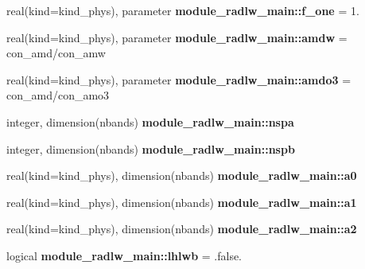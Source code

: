 \begin{DoxyCompactItemize}
\item 
\mbox{\label{group__module__radlw__main_ga518605a1451822f1888c6c7e85e07328}} 
real(kind=kind\+\_\+phys), parameter {\bfseries module\+\_\+radlw\+\_\+main\+::f\+\_\+one} = 1.
\item 
\mbox{\label{group__module__radlw__main_ga9845c3a6eaa014e6a310fe1436162e37}} 
real(kind=kind\+\_\+phys), parameter {\bfseries module\+\_\+radlw\+\_\+main\+::amdw} = con\+\_\+amd/con\+\_\+amw
\item 
\mbox{\label{group__module__radlw__main_ga06f62c34722a3d7dcec9b5643d78f039}} 
real(kind=kind\+\_\+phys), parameter {\bfseries module\+\_\+radlw\+\_\+main\+::amdo3} = con\+\_\+amd/con\+\_\+amo3
\item 
\mbox{\label{group__module__radlw__main_ga42bbf62b5d91586f17d352af74e3c032}} 
integer, dimension(nbands) {\bfseries module\+\_\+radlw\+\_\+main\+::nspa}
\item 
\mbox{\label{group__module__radlw__main_ga520be8a7f308d9e2c8e88b185170404e}} 
integer, dimension(nbands) {\bfseries module\+\_\+radlw\+\_\+main\+::nspb}
\item 
\mbox{\label{group__module__radlw__main_gae55000724e738b7a5b7be4c8cef07553}} 
real(kind=kind\+\_\+phys), dimension(nbands) {\bfseries module\+\_\+radlw\+\_\+main\+::a0}
\item 
\mbox{\label{group__module__radlw__main_gaeba888f00b19a65460f3b587c60ea4a0}} 
real(kind=kind\+\_\+phys), dimension(nbands) {\bfseries module\+\_\+radlw\+\_\+main\+::a1}
\item 
\mbox{\label{group__module__radlw__main_ga1b4681c9bcc9434e30fef0ca4aaa9dcd}} 
real(kind=kind\+\_\+phys), dimension(nbands) {\bfseries module\+\_\+radlw\+\_\+main\+::a2}
\item 
\mbox{\label{group__module__radlw__main_ga40b8a6f612a53e0a768cf922aa6f73c3}} 
logical {\bfseries module\+\_\+radlw\+\_\+main\+::lhlwb} = .false.

\end{DoxyCompactItemize}
